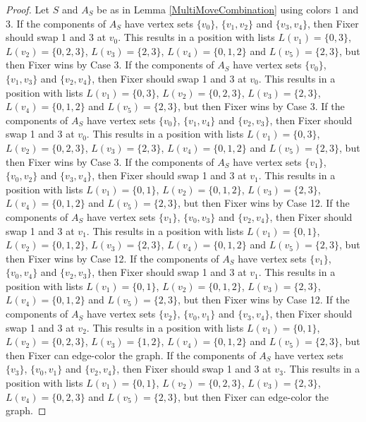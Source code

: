 \documentclass[12pt]{amsart}
\theoremstyle{plain}
\theoremstyle{definition}
\theoremstyle{remark}
\begin{document}
\begin{proof}
Let $S$ and $A_S$ be as in Lemma \ref{MultiMoveCombination} using colors $1$ and $3$. If the components of $A_S$ have vertex sets $\{v_0\}$, $\{v_1, v_2\}$ and $\{v_3, v_4\}$, then Fixer should swap 1 and 3 at $v_0$. This results in a position with lists $L(v_1) = \{0, 3\}$, $L(v_2) = \{0, 2, 3\}$, $L(v_3) = \{2, 3\}$, $L(v_4) = \{0, 1, 2\}$ and $L(v_5) = \{2, 3\}$, but then Fixer wins by Case 3.
If the components of $A_S$ have vertex sets $\{v_0\}$, $\{v_1, v_3\}$ and $\{v_2, v_4\}$, then Fixer should swap 1 and 3 at $v_0$. This results in a position with lists $L(v_1) = \{0, 3\}$, $L(v_2) = \{0, 2, 3\}$, $L(v_3) = \{2, 3\}$, $L(v_4) = \{0, 1, 2\}$ and $L(v_5) = \{2, 3\}$, but then Fixer wins by Case 3.
If the components of $A_S$ have vertex sets $\{v_0\}$, $\{v_1, v_4\}$ and $\{v_2, v_3\}$, then Fixer should swap 1 and 3 at $v_0$. This results in a position with lists $L(v_1) = \{0, 3\}$, $L(v_2) = \{0, 2, 3\}$, $L(v_3) = \{2, 3\}$, $L(v_4) = \{0, 1, 2\}$ and $L(v_5) = \{2, 3\}$, but then Fixer wins by Case 3.
If the components of $A_S$ have vertex sets $\{v_1\}$, $\{v_0, v_2\}$ and $\{v_3, v_4\}$, then Fixer should swap 1 and 3 at $v_1$. This results in a position with lists $L(v_1) = \{0, 1\}$, $L(v_2) = \{0, 1, 2\}$, $L(v_3) = \{2, 3\}$, $L(v_4) = \{0, 1, 2\}$ and $L(v_5) = \{2, 3\}$, but then Fixer wins by Case 12.
If the components of $A_S$ have vertex sets $\{v_1\}$, $\{v_0, v_3\}$ and $\{v_2, v_4\}$, then Fixer should swap 1 and 3 at $v_1$. This results in a position with lists $L(v_1) = \{0, 1\}$, $L(v_2) = \{0, 1, 2\}$, $L(v_3) = \{2, 3\}$, $L(v_4) = \{0, 1, 2\}$ and $L(v_5) = \{2, 3\}$, but then Fixer wins by Case 12.
If the components of $A_S$ have vertex sets $\{v_1\}$, $\{v_0, v_4\}$ and $\{v_2, v_3\}$, then Fixer should swap 1 and 3 at $v_1$. This results in a position with lists $L(v_1) = \{0, 1\}$, $L(v_2) = \{0, 1, 2\}$, $L(v_3) = \{2, 3\}$, $L(v_4) = \{0, 1, 2\}$ and $L(v_5) = \{2, 3\}$, but then Fixer wins by Case 12.
If the components of $A_S$ have vertex sets $\{v_2\}$, $\{v_0, v_1\}$ and $\{v_3, v_4\}$, then Fixer should swap 1 and 3 at $v_2$. This results in a position with lists $L(v_1) = \{0, 1\}$, $L(v_2) = \{0, 2, 3\}$, $L(v_3) = \{1, 2\}$, $L(v_4) = \{0, 1, 2\}$ and $L(v_5) = \{2, 3\}$, but then Fixer can edge-color the graph.
If the components of $A_S$ have vertex sets $\{v_3\}$, $\{v_0, v_1\}$ and $\{v_2, v_4\}$, then Fixer should swap 1 and 3 at $v_3$. This results in a position with lists $L(v_1) = \{0, 1\}$, $L(v_2) = \{0, 2, 3\}$, $L(v_3) = \{2, 3\}$, $L(v_4) = \{0, 2, 3\}$ and $L(v_5) = \{2, 3\}$, but then Fixer can edge-color the graph.

\end{proof}
\end{document}
